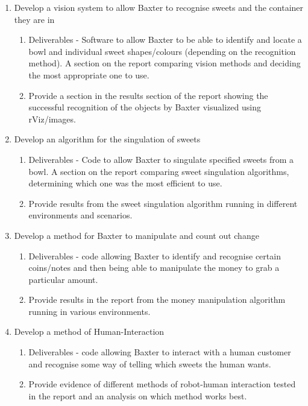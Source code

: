\begin{enumerate}
    \item{Develop a vision system to allow Baxter to recognise sweets and the container they are in}
    	\begin{enumerate}
		\item{Deliverables - Software to allow Baxter to be able to identify and locate a bowl and individual sweet shapes/colours (depending on the recognition method). A section on the report comparing vision methods and deciding the most appropriate one to use.} 
		\item{Provide a section in the results section of the report showing the successful recognition of the objects by Baxter visualized using rViz/images.}
	\end{enumerate}	
    \item{Develop an algorithm for the singulation of sweets}
    	\begin{enumerate}
		\item{Deliverables - Code to allow Baxter to singulate specified sweets from a bowl. A section on the report comparing sweet singulation algorithms, determining which one was the most efficient to use.}
		\item{Provide results from the sweet singulation algorithm running in different environments and scenarios.}
	\end{enumerate}	
    \item{Develop a method for Baxter to manipulate and count out change}
    	\begin{enumerate}
		\item{Deliverables - code allowing Baxter to identify and recognise certain coins/notes and then being able to manipulate the money to grab a particular amount.}
		\item{Provide results in the report from the money manipulation algorithm running in 		various environments.}
	\end{enumerate}	
    \item{Develop a method of Human-Interaction}
    	\begin{enumerate}
		\item{Deliverables - code allowing Baxter to interact with a human customer and 		recognise some way of telling which sweets the human wants.}
		\item{Provide evidence of different methods of robot-human interaction tested in the 		report and an analysis on which method works best.}
	\end{enumerate}	
\end{enumerate}
